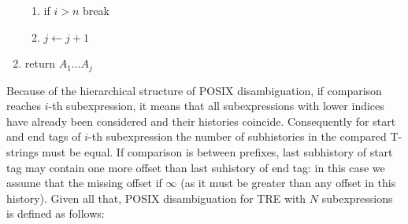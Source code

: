 \documentclass{article}
\newcommand{\Xset}{\!\leftarrow\!}
\theoremstyle{definition}
\begin{document}
\begin{multicols}{2}
\begin{enumerate}[leftmargin=0in]
\begin{enumerate}
            \item[] if $i \!>\! n$ break
            \item[] $j \Xset j \!+\! 1$

        \end{enumerate}
        \item[] return $A_1 \dots A_j$
    \end{enumerate}

    \bigskip

Because of the hierarchical structure of POSIX disambiguation, if comparison reaches $i$-th subexpression,
it means that all subexpressions with lower indices have already been considered and their histories coincide.
Consequently for start and end tags of $i$-th subexpression
the number of subhistories in the compared T-strings must be equal.
If comparison is between prefixes, last subhistory of start tag may contain one more offset than last suhistory of end tag:
in this case we assume that the missing offset if $\infty$ (as it must be greater than any offset in this history).
Given all that, POSIX disambiguation for TRE with $N$ subexpressions is defined as follows:
\\


\end{multicols}
\end{document}
